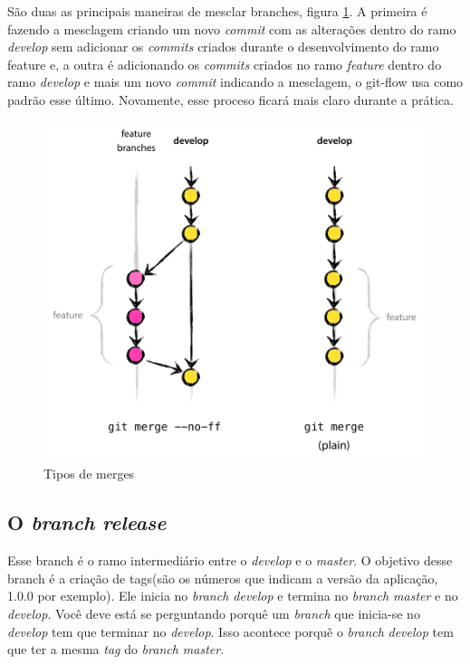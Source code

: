 \documentclass[12pt,openright,oneside,a4paper,english,brazil]{abntex2}
\begin{document}
São duas as principais maneiras de mesclar branches, figura \ref{feature-merges}. A primeira é fazendo a mesclagem criando um novo \textit{commit} com as alterações dentro do ramo \textit{develop} sem adicionar os \textit{commits} criados durante o desenvolvimento do ramo feature e, a outra é adicionando os \textit{commits} criados no ramo \textit{feature} dentro do ramo \textit{develop} e mais um novo \textit{commit} indicando a mesclagem, o git-flow usa como padrão esse último. Novamente, esse proceso ficará mais claro durante a prática.


\begin{figure}[h]
	\caption{\label{feature-merges}Tipos de merges}
	\begin{center}
		\includegraphics[width=0.8\linewidth]{imagens/feature-merges}
	\end{center}
\end{figure}

\subsection{O \textit{branch release}}

Esse branch é o ramo intermediário entre o \textit{develop} e o \textit{master}. O objetivo desse branch é a criação de tags(são os números que indicam a versão da aplicação, 1.0.0 por exemplo). Ele inicia no \textit{branch develop} e termina no \textit{branch master} e no \textit{develop}. Você deve está se perguntando porquê um \textit{branch} que inicia-se no \textit{develop} tem que terminar no \textit{develop}. Isso acontece porquê o \textit{branch} \textit{develop} tem que ter a mesma \textit{tag} do \textit{branch master}.
\end{document}
